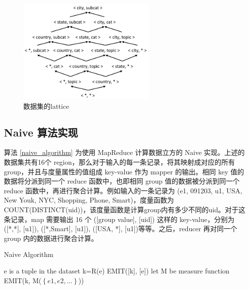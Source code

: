 \begin{figure}[!htb]
\centering\includegraphics[width=2.7in]{picture/ch_datacube_mr/dataset_lattice} 
\caption{数据集的lattice}\label{dataset_lattice4} 
\end{figure} 

\subsection{Naive 算法实现}
 
算法 \ref{naive_algorithm} 为使用 MapReduce 计算数据立方的 Naive 实现。上述的数据集共有16个 region，那么对于输入的每一条记录，将其映射成对应的所有 group，并且与度量属性的值组成 key-value 作为 mapper 的输出。相同 key 值的数据将分派到同一个 reduce 函数中，也即相同 group 值的数据被分派到同一个 reduce 函数中，再进行聚合计算。例如输入的一条记录为 (e1, 091203, u1, USA, New Youk, NYC, Shopping, Phone, Smart)，度量函数为 COUNT(DISTINCT(uid))，该度量函数是计算group内有多少不同的uid。对于这条记录，map 需要输出 16 个 ([group value], [uid]) 这样的 key-value，分别为([*,*], [u1]), ([*,Smart], [u1]), ([USA, *], [u1])等等。之后，reducer 再对同一个 group 内的数据进行聚合计算。

{\renewcommand\baselinestretch{1} 
\begin{algorithm}[!ht]
\caption{Naive Algorithm}
\label{naive_algorithm}
{\fontfamily{\familydefault}\selectfont

	\begin{algorithmic}[1] %
    	\State e is a tuple in the dataset
        	\State k=R(e)
        	\State EMIT([k], [e])
        \EndFor
   	 \EndFunction
     \State
     	\State let M be measure function
        \State EMIT(k, M($\left\{ e1,e2,...\right\}$))
     \EndFunction
	\end{algorithmic}
}
\end{algorithm}
\par}

